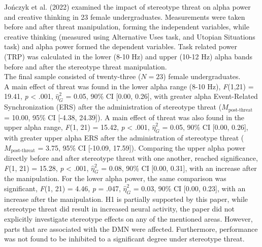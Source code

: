 \documentclass[
  stu, a4paper,floatsintext]{apa7}
\begin{document}
Jończyk et al. (2022) examined the impact of stereotype threat on alpha power and creative thinking in 23 female undergraduates.
Measurements were taken before and after threat manipulation, forming the independent variables, while creative thinking (measured using Alternative Uses task, and Utopian Situations task) and alpha power formed the dependent variables.
Task related power (TRP) was calculated in the lower (8-10 Hz) and upper (10-12 Hz) alpha bands before and after the stereotype threat manipulation.\\
The final sample consisted of twenty-three (\(N = 23\)) female undergraduates.\\
A main effect of threat was found in the lower alpha range (8-10 Hz), \emph{F}(1,21) = 19.41, \emph{p} \textless{} .001, \(\hat{\eta}^{2}_{G}\) = 0.05, 90\% CI {[}0.00, 0.26{]}, with greater alpha Event-Related Synchronization (ERS) after the administration of stereotype threat (\(M_{\text{post-threat}}\) = 10.00, 95\% CI {[}-4.38, 24.39{]}).
A main effect of threat was also found in the upper alpha range, \emph{F}(1, 21) = 15.42, \emph{p} \textless{} .001, \(\hat{\eta}^{2}_{G}\) = 0.05, 90\% CI {[}0.00, 0.26{]}, with greater upper alpha ERS after the administration of stereotype threat (\(M_{\text{post-threat}}\) = 3.75, 95\% CI {[}-10.09, 17.59{]}).
Comparing the upper alpha power directly before and after stereotype threat with one another, reached significance, \emph{F}(1, 21) = 15.28, \emph{p} \textless{} .001, \(\hat{\eta}^{2}_{G}\) = 0.08, 90\% CI {[}0.00, 0.31{]}, with an increase after the manipulation.
For the lower alpha power, the same comparison was significant, \emph{F}(1, 21) = 4.46, \emph{p} = .047, \(\hat{\eta}^{2}_{G}\) = 0.03, 90\% CI {[}0.00, 0.23{]}, with an increase after the manipulation.
H1 is partially supported by this paper, while stereotype threat did result in increased neural activity, the paper did not explicitly investigate stereotype effects on any of the mentioned areas. However, parts that are associated with the DMN were affected. Furthermore, performance was not found to be inhibited to a significant degree under stereotype threat.
\end{document}

